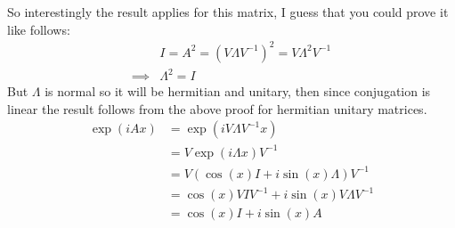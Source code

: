 \documentclass[]{article}
\begin{document}
So interestingly the result applies for this matrix, I guess that you could prove it like follows:
\begin{align*}
&I=A^2=(V\Lambda V^{-1})^2=V\Lambda^2V^{-1}
\\\implies &\Lambda^2=I
\end{align*}
But $\Lambda$ is normal so it will be hermitian and unitary, then since conjugation is linear the result follows from the above proof for hermitian unitary matrices.
\begin{align*}
\exp(iAx)
&=\exp(iV\Lambda V^{-1}x)
\\&=V\exp(i\Lambda x)V^{-1}
\\&=V(\cos(x)I + i\sin(x)\Lambda)V^{-1}
\\&=\cos(x)VIV^{-1} + i\sin(x)V\Lambda V^{-1}
\\&=\cos(x)I + i\sin(x)A
\end{align*}
\end{document}
